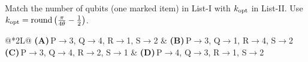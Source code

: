 \documentclass[11pt,a4paper]{article}
\newcommand{\optlabel}[1]{\textbf{(#1)}}
\newenvironment{qitem}[1]{\begin{list}{}{\setlength{\leftmargin}{3.3em}\setlength{\labelwidth}{3.1em}%
  \setlength{\labelsep}{0.2em}\setlength{\topsep}{3pt}\setlength{\parsep}{3pt}}\item[\textbf{Q.#1}\hfill]}{\end{list}}
\newcommand{\qsep}{\par\vspace{2pt}{\color{black!15}\hrule}\vspace{4pt}}
\begin{document}
\begin{qitem}{55}
Match the number of qubits (one marked item) in List-I with $k_{\rm opt}$ in List-II. Use $k_{\rm opt} = \operatorname{round}\big(\frac{\pi}{4\theta} - \frac12\big)$.
\par\smallskip{}
\par\smallskip\noindent\begin{tabularx}{\linewidth}{@{}*{2}{L}@{}}
\optlabel{A}\,P$\to$3, Q$\to$4, R$\to$1, S$\to$2 & \optlabel{B}\,P$\to$3, Q$\to$1, R$\to$4, S$\to$2 \\[3pt]
\optlabel{C}\,P$\to$3, Q$\to$4, R$\to$2, S$\to$1 & \optlabel{D}\,P$\to$4, Q$\to$3, R$\to$1, S$\to$2
\end{tabularx}
\end{qitem}
\qsep
\end{document}
